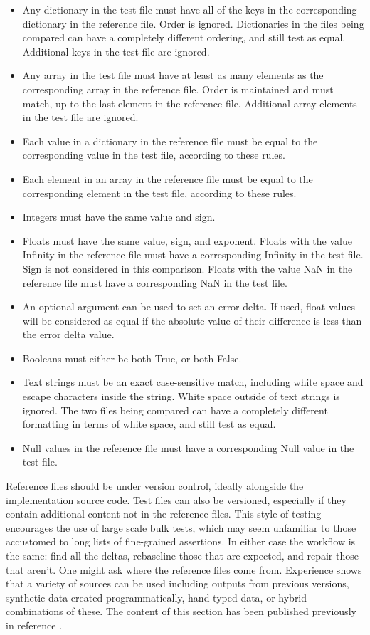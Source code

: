 \documentclass[a4paper,10pt]{article}
\begin{document}
\begin{itemize}
 \item Any dictionary in the test file must have all of the keys in the corresponding dictionary in the reference file. Order is ignored. Dictionaries in the files being compared can have a completely different ordering, and still test as equal. Additional keys in the test file are ignored.
 \item Any array in the test file must have at least as many elements as the corresponding array in the reference file. Order is maintained and must match, up to the last element in the reference file. Additional array elements in the test file are ignored.
 \item Each value in a dictionary in the reference file must be equal to the corresponding value in the test file, according to these rules.
 \item Each element in an array in the reference file must be equal to the corresponding element in the test file, according to these rules.
 \item Integers must have the same value and sign.
 \item Floats must have the same value, sign, and exponent. Floats with the value Infinity in the reference file must have a corresponding Infinity in the test file. Sign is not considered in this comparison. Floats with the value NaN in the reference file must have a corresponding NaN in the test file.
 \item An optional argument can be used to set an error delta. If used, float values will be considered as equal if the absolute value of their difference is less than the error delta value.
 \item Booleans must either be both True, or both False.
 \item Text strings must be an exact case-sensitive match, including white space and escape characters inside the string. White space outside of text strings is ignored. The two files being compared can have a completely different formatting in terms of white space, and still test as equal.
 \item Null values in the reference file must have a corresponding Null value in the test file.
\end{itemize}

Reference files should be under version control, ideally alongside the implementation source code. Test files can also be versioned, especially if they contain additional content not in the reference files. This style of testing encourages the use of large scale bulk tests, which may seem unfamiliar to those accustomed to long lists of fine-grained assertions. In either case the workflow is the same: find all the deltas, rebaseline those that are expected, and repair those that aren't. One might ask where the reference files come from. Experience shows that a variety of sources can be used including outputs from previous versions, synthetic data created programmatically, hand typed data, or hybrid combinations of these. The content of this section has been published previously in reference \cite{asymmetricRules}.
\end{document}
